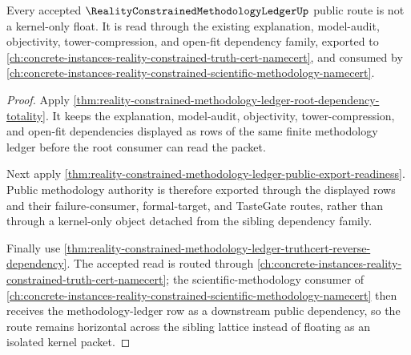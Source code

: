 \begin{theorem}
\label{thm:reality-constrained-methodology-ledger-sibling-lattice-route}
Every accepted $\RealityConstrainedMethodologyLedgerUp$ public route is not a kernel-only float. It is read through the existing explanation, model-audit, objectivity, tower-compression, and open-fit dependency family, exported to \autoref{ch:concrete-instances-reality-constrained-truth-cert-namecert}, and consumed by \autoref{ch:concrete-instances-reality-constrained-scientific-methodology-namecert}.
\end{theorem}
\begin{proof}
Apply \autoref{thm:reality-constrained-methodology-ledger-root-dependency-totality}. It keeps the explanation, model-audit, objectivity, tower-compression, and open-fit dependencies displayed as rows of the same finite methodology ledger before the root consumer can read the packet.

Next apply \autoref{thm:reality-constrained-methodology-ledger-public-export-readiness}. Public methodology authority is therefore exported through the displayed rows and their failure-consumer, formal-target, and TasteGate routes, rather than through a kernel-only object detached from the sibling dependency family.

Finally use \autoref{thm:reality-constrained-methodology-ledger-truthcert-reverse-dependency}. The accepted read is routed through \autoref{ch:concrete-instances-reality-constrained-truth-cert-namecert}; the scientific-methodology consumer of \autoref{ch:concrete-instances-reality-constrained-scientific-methodology-namecert} then receives the methodology-ledger row as a downstream public dependency, so the route remains horizontal across the sibling lattice instead of floating as an isolated kernel packet.
\end{proof}
